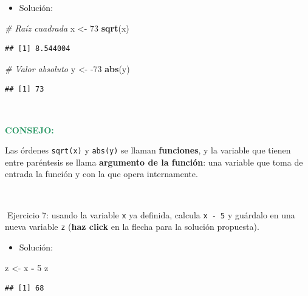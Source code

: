 \documentclass[11pt,]{book}
\newenvironment{Shaded}{\begin{snugshade}}{\end{snugshade}}
\newcommand{\CommentTok}[1]{\textcolor[rgb]{0.37,0.37,0.37}{\textit{#1}}}
\newcommand{\DecValTok}[1]{\textcolor[rgb]{0.06,0.06,0.06}{#1}}
\newcommand{\KeywordTok}[1]{\textcolor[rgb]{0.27,0.27,0.27}{\textbf{#1}}}
\newcommand{\NormalTok}[1]{#1}
\newcommand{\OperatorTok}[1]{\textcolor[rgb]{0.43,0.43,0.43}{\textbf{#1}}}
\newcommand{\StringTok}[1]{\textcolor[rgb]{0.5,0.5,0.5}{#1}}
\providecommand{\tightlist}{%
  \setlength{\itemsep}{0pt}\setlength{\parskip}{0pt}}
\begin{document}
\begin{itemize}
\tightlist
\item
  Solución:
\end{itemize}

\begin{Shaded}
\begin{Highlighting}[]
\CommentTok{# Raíz cuadrada}
\NormalTok{x <-}\StringTok{ }\DecValTok{73}
\KeywordTok{sqrt}\NormalTok{(x)}
\end{Highlighting}
\end{Shaded}

\begin{verbatim}
## [1] 8.544004
\end{verbatim}

\begin{Shaded}
\begin{Highlighting}[]
\CommentTok{# Valor absoluto}
\NormalTok{y <-}\StringTok{ }\DecValTok{-73}
\KeywordTok{abs}\NormalTok{(y)}
\end{Highlighting}
\end{Shaded}

\begin{verbatim}
## [1] 73
\end{verbatim}

~

\textbf{\textcolor{#20935E}{CONSEJO:}}

Las órdenes \texttt{sqrt(x)} y \texttt{abs(y)} se llaman \textbf{funciones}, y la variable que tienen entre paréntesis se llama \textbf{argumento de la función}: una variable que toma de entrada la función y con la que opera internamente.

~

📝Ejercicio 7: usando la variable \texttt{x} ya definida, calcula \texttt{x\ -\ 5} y guárdalo en una nueva variable \texttt{z} (\textbf{haz click} en la flecha para la solución propuesta).

\begin{itemize}
\tightlist
\item
  Solución:
\end{itemize}

\begin{Shaded}
\begin{Highlighting}[]
\NormalTok{z <-}\StringTok{ }\NormalTok{x }\OperatorTok{-}\StringTok{ }\DecValTok{5}
\NormalTok{z}
\end{Highlighting}
\end{Shaded}

\begin{verbatim}
## [1] 68
\end{verbatim}
\end{document}
